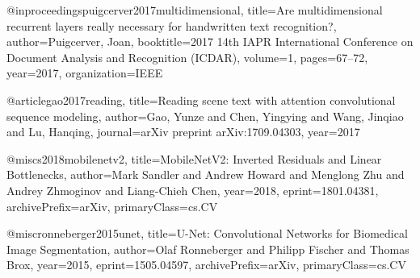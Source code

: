 @inproceedings{puigcerver2017multidimensional,
  title={Are multidimensional recurrent layers really necessary for handwritten text recognition?},
  author={Puigcerver, Joan},
  booktitle={2017 14th IAPR International Conference on Document Analysis and Recognition (ICDAR)},
  volume={1},
  pages={67--72},
  year={2017},
  organization={IEEE}
}

@article{gao2017reading,
  title={Reading scene text with attention convolutional sequence modeling},
  author={Gao, Yunze and Chen, Yingying and Wang, Jinqiao and Lu, Hanqing},
  journal={arXiv preprint arXiv:1709.04303},
  year={2017}
}

@misc{s2018mobilenetv2,
    title={MobileNetV2: Inverted Residuals and Linear Bottlenecks},
    author={Mark Sandler and Andrew Howard and Menglong Zhu and Andrey Zhmoginov and Liang-Chieh Chen},
    year={2018},
    eprint={1801.04381},
    archivePrefix={arXiv},
    primaryClass={cs.CV}
}

@misc{ronneberger2015unet,
    title={U-Net: Convolutional Networks for Biomedical Image Segmentation},
    author={Olaf Ronneberger and Philipp Fischer and Thomas Brox},
    year={2015},
    eprint={1505.04597},
    archivePrefix={arXiv},
    primaryClass={cs.CV}
}